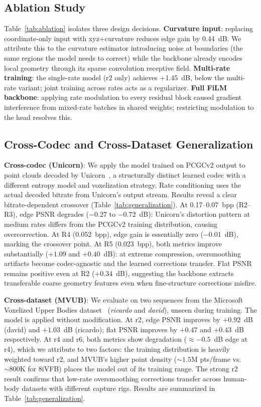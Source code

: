 \documentclass[conference]{IEEEtran}
\begin{document}
\subsection{Ablation Study}
\label{subsec:ablation}

Table~\ref{tab:ablation} isolates three design decisions. \textbf{Curvature
input}: replacing coordinate-only input with xyz+curvature reduces edge gain by
0.44~dB. We attribute this to the curvature estimator introducing noise at boundaries
(the same regions the model needs to correct) while the backbone already
encodes local geometry through its sparse convolution receptive field.
\textbf{Multi-rate training}: the single-rate model (r2 only) achieves
+1.45~dB, below the multi-rate variant; joint training across rates acts as a
regularizer. \textbf{Full FiLM backbone}: applying rate modulation to every
residual block caused gradient interference from mixed-rate batches in shared
weights; restricting modulation to the head resolves this.


\subsection{Cross-Codec and Cross-Dataset Generalization}
\label{subsec:generalization}

\textbf{Cross-codec (Unicorn)}: We apply the model trained on PCGCv2 output
to point clouds decoded by Unicorn~\cite{wang2025unicorn}, a structurally distinct
learned codec with a different entropy model and voxelization strategy. Rate
conditioning uses the actual decoded bitrate from Unicorn's output stream.
Results reveal a clear bitrate-dependent crossover (Table~\ref{tab:generalization}).
At 0.17--0.07~bpp (R2--R3), edge PSNR degrades ($-0.27$ to $-0.72$~dB): Unicorn's
distortion pattern at medium rates differs from the PCGCv2 training distribution,
causing overcorrection. At R4 (0.052~bpp), edge gain is essentially zero ($-0.01$~dB),
marking the crossover point. At R5 (0.023~bpp), both metrics improve substantially
($+1.09$ and $+0.40$~dB): at extreme compression, oversmoothing artifacts become
codec-agnostic and the learned corrections transfer. Flat PSNR remains positive even
at R2 ($+0.34$~dB), suggesting the backbone extracts transferable coarse geometry
features even when fine-structure corrections misfire.

\textbf{Cross-dataset (MVUB)}: We evaluate on two sequences from the Microsoft
Voxelized Upper Bodies dataset~\cite{loop2016mvub} (\emph{ricardo} and
\emph{david}), unseen during training. The model is applied without
modification. At r2, edge PSNR improves by $+0.92$~dB (david) and $+1.03$~dB
(ricardo); flat PSNR improves by $+0.47$ and $+0.43$~dB respectively. At r4
and r6, both metrics show degradation (${\approx}{-0.5}$~dB edge at r4),
which we attribute to two factors: the training distribution is heavily
weighted toward r2, and MVUB's higher point density (${\sim}1.5$M pts/frame
vs.\ ${\sim}800$K for 8iVFB) places the model out of its training range.
The strong r2 result confirms that low-rate oversmoothing corrections transfer
across human-body datasets with different capture rigs.
Results are summarized in Table~\ref{tab:generalization}.
\end{document}
